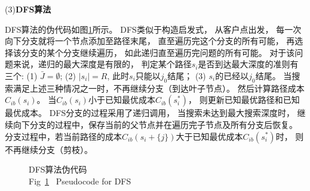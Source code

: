 (3){\textbf{DFS算法}}

DFS算法的伪代码如图\ref{fig:dfs_pseudo}所示。
DFS类似于构造启发式，
从客户点出发，
每一次向下分支就将一个节点添加至路径末尾，
直至遍历完这个分支的所有可能，
再选择该分支的某个分支继续遍历，
如此递归直至遍历完问题的所有可能。
对于该问题来说，递归的最大深度是有限的，
判定某个路径$s_i$是否到达最大深度的准则有三个: 
(1) $\bar{J} = \emptyset$; 
(2) $|s_i| = R$, 此时$s_i$只能以$j_0$结尾；
(3) $s_i$的已经以$j_0$结尾。
当搜索满足上述三种情况之一时，不再继续分支（到达叶子节点）。
然后计算路径成本$C_{ib}({s_i})$。
当$C_{ib}({s_i})$小于已知最优成本$C_{ib}({s_i^*})$，
则更新已知最优路径和已知最优成本。
DFS分支的过程采用了递归调用，
当搜索未达到最大搜索深度时，
继续向下分支的过程中，保存当前的父节点并在遍历完子节点及所有分支后恢复。
分支过程中，若当前路径的成本$C_{ib}({s_i+\{j\}})$大于已知最优成本$C_{ib}({s_i^*})$时，
则不再继续分支（剪枝）。


\begin{figure}[htb]
    \centering
    \setlength{\belowcaptionskip}{-0.5cm} 
\caption{DFS算法伪代码\\Fig~\ref{fig:dfs_pseudo}~ Pseudocode for DFS}
    \label{fig:dfs_pseudo}
\end{figure}


